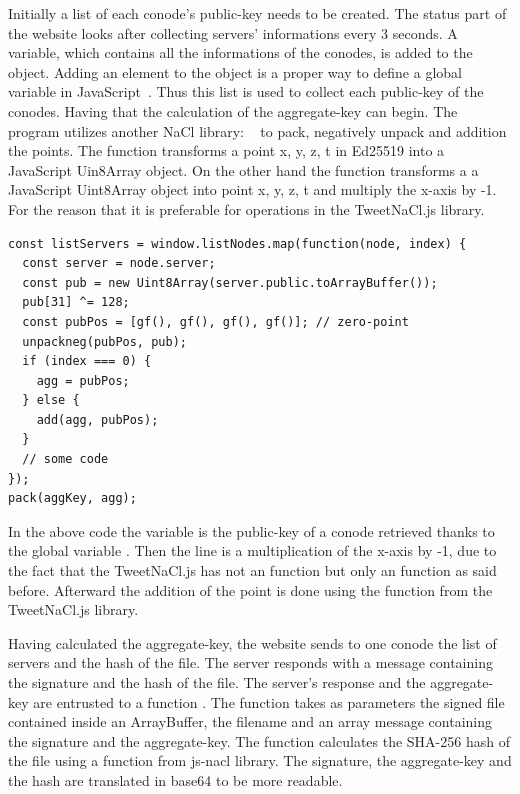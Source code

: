 \documentclass[11pt, a4paper, twoside, openright, openany]{book} %
\begin{document}
Initially a list of each conode's public-key needs to be created. The status part
of the website looks after collecting servers' informations every 3 seconds. A variable,
which contains all the informations of the conodes, is added to the  object.
Adding an element to the  object is a proper way to define a global variable
in JavaScript~\cite{globalVariable}. Thus this list is used to collect each public-key
of the conodes. Having that the calculation of the aggregate-key can begin.
The program utilizes another NaCl library: ~\cite{tweetNacl} to
pack, negatively unpack and addition the points. The function  transforms a point x, y, z, t in Ed25519
into a JavaScript Uin8Array object. On the other hand the function 
transforms a a JavaScript Uint8Array object into point x, y, z, t and multiply
the x-axis by -1. For the reason that it is preferable for operations in the TweetNaCl.js library.
\bigbreak

\begin{lstlisting}[caption={Extract of the code calculating the aggregate-key}, captionpos=b]
const listServers = window.listNodes.map(function(node, index) {
  const server = node.server;
  const pub = new Uint8Array(server.public.toArrayBuffer());
  pub[31] ^= 128;
  const pubPos = [gf(), gf(), gf(), gf()]; // zero-point
  unpackneg(pubPos, pub);
  if (index === 0) {
    agg = pubPos;
  } else {
    add(agg, pubPos);
  }
  // some code
});
pack(aggKey, agg);
\end{lstlisting}
\leavevmode \newline

In the above code the variable  is the public-key of a conode retrieved thanks to
the global variable .
\newline
Then the line  is
a multiplication of the x-axis by -1, due to the fact that the TweetNaCl.js has not
an  function but only an  function as said before.
\newline
Afterward the addition of the point is done using the  function from
the TweetNaCl.js library.
\bigbreak

Having calculated the aggregate-key, the website sends to one conode the list of servers
and the hash of the file. The server responds with a message containing the signature
and the hash of the file. The server's response and the aggregate-key are entrusted to a function
.
\newline
The function takes as parameters the signed file contained inside an ArrayBuffer,
the filename and an array message containing the signature and the aggregate-key.
The function calculates the SHA-256 hash of the file using a function from js-nacl library.
The signature, the aggregate-key and the hash are translated in base64 to be more readable.
\bigbreak
\end{document}

